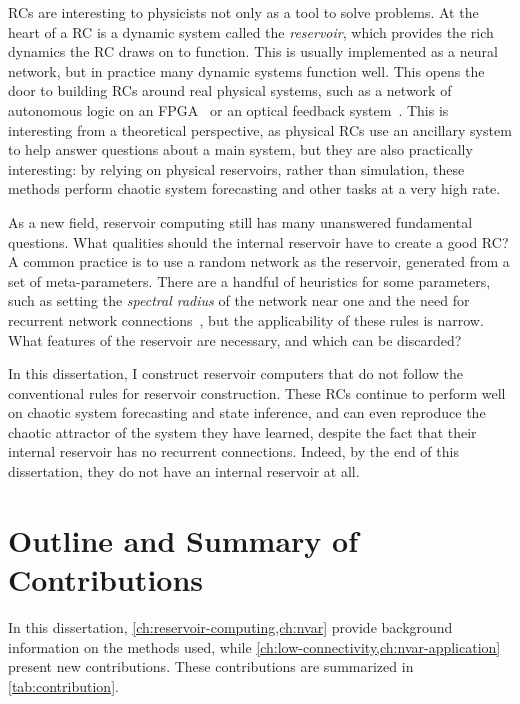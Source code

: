 RCs are interesting to physicists not only as a tool to solve
problems. At the heart of a RC is a dynamic system called the
\emph{reservoir}, which provides the rich dynamics the RC draws on to
function. This is usually implemented as a neural network, but in
practice many dynamic systems function well. This opens the door to
building RCs around real physical systems, such as a network of
autonomous logic on an FPGA~\cite{canaday2018} or an optical feedback
system~\cite{antonik2016}. This is interesting from a theoretical
perspective, as physical RCs use an ancillary system to help answer
questions about a main system, but they are also practically
interesting: by relying on physical reservoirs, rather than
simulation, these methods perform chaotic system forecasting and other
tasks at a very high rate.

As a new field, reservoir computing still has many unanswered
fundamental questions. What qualities should the internal reservoir
have to create a good RC? A common practice is to use a random network
as the reservoir, generated from a set of meta-parameters. There are a
handful of heuristics for some parameters, such as setting the
\emph{spectral radius} of the network near one and the need for
recurrent network connections~\cite{jaeger2001,lukosevicius2012}, but
the applicability of these rules is narrow. What features of the
reservoir are necessary, and which can be discarded?

In this dissertation, I construct reservoir computers that do not
follow the conventional rules for reservoir construction. These RCs
continue to perform well on chaotic system forecasting and state
inference, and can even reproduce the chaotic attractor of the system
they have learned, despite the fact that their internal reservoir has
no recurrent connections. Indeed, by the end of this dissertation, they do
not have an internal reservoir at all.

\section{Outline and Summary of Contributions}

In this dissertation, \cref{ch:reservoir-computing,ch:nvar} provide
background information on the methods used, while
\cref{ch:low-connectivity,ch:nvar-application} present new
contributions. These contributions are summarized in \cref{tab:contribution}.

